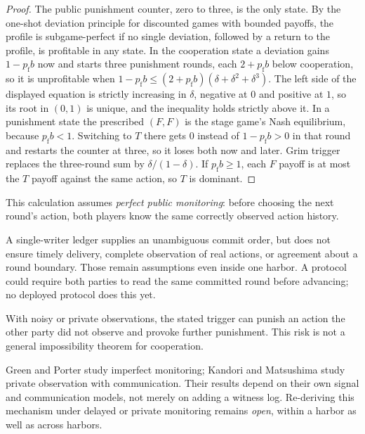 \documentclass[11pt,a4paper]{article}
\theoremstyle{definition}
\theoremstyle{remark}
\begin{document}
\begin{proof}
\setlength{\parskip}{4pt plus 1pt}
The public punishment counter, zero to three, is the only state. By the one-shot deviation principle for discounted games with bounded payoffs, the profile is subgame-perfect if no single deviation, followed by a return to the profile, is profitable in any state. In the cooperation state a deviation gains $1-p_{\mathrm f}b$ now and starts three punishment rounds, each $2+p_{\mathrm f}b$ below cooperation, so it is unprofitable when $1-p_{\mathrm f}b\le(2+p_{\mathrm f}b)(\delta+\delta^2+\delta^3)$. The left side of the displayed equation is strictly increasing in $\delta$, negative at $0$ and positive at $1$, so its root in $(0,1)$ is unique, and the inequality holds strictly above it. In a punishment state the prescribed $(F,F)$ is the stage game's Nash equilibrium, because $p_{\mathrm f}b<1$. Switching to $T$ there gets $0$ instead of $1-p_{\mathrm f}b>0$ in that round and restarts the counter at three, so it loses both now and later. Grim trigger replaces the three-round sum by $\delta/(1-\delta)$. If $p_{\mathrm f}b\ge1$, each $F$ payoff is at most the $T$ payoff against the same action, so $T$ is dominant.
\end{proof}

\begin{pdboundary}
\setlength{\parskip}{4pt plus 1pt}
This calculation assumes \emph{perfect public monitoring}: before choosing the
next round's action, both players know the same correctly observed action history.


A single-writer ledger supplies an unambiguous commit order, but does not ensure
timely delivery, complete observation of real actions, or agreement about a
round boundary. Those remain assumptions even inside one harbor. A protocol
could require both parties to read the same committed round before advancing;
no deployed protocol does this yet.

With noisy or private observations, the stated trigger can punish an action the
other party did not observe and provoke further punishment. This risk is not a
general impossibility theorem for cooperation.

Green and Porter
 study imperfect monitoring; Kandori and Matsushima
 study private observation with communication.
Their results depend on their own signal and communication models, not merely
on adding a witness log. Re-deriving this mechanism under delayed or private
monitoring remains \emph{open}, within a harbor as well as across harbors.
\end{pdboundary}
\end{document}

